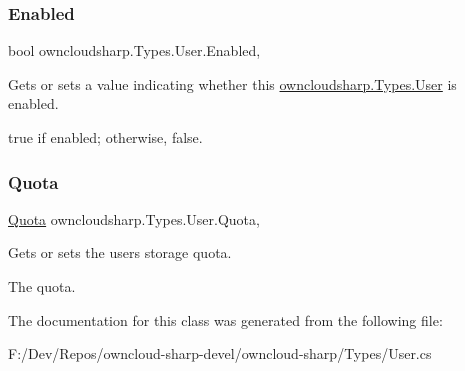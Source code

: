 \subsubsection{\texorpdfstring{Enabled}{Enabled}}
{\footnotesize\ttfamily bool owncloudsharp.\+Types.\+User.\+Enabled\hspace{0.3cm}{\ttfamily [get]}, {\ttfamily [set]}}



Gets or sets a value indicating whether this \hyperlink{classowncloudsharp_1_1_types_1_1_user}{owncloudsharp.\+Types.\+User} is enabled. 

{\ttfamily true} if enabled; otherwise, {\ttfamily false}.\mbox{\label{classowncloudsharp_1_1_types_1_1_user_aff24ca447feae66be8ef929cd94a2d21}} 
\subsubsection{\texorpdfstring{Quota}{Quota}}
{\footnotesize\ttfamily \hyperlink{classowncloudsharp_1_1_types_1_1_quota}{Quota} owncloudsharp.\+Types.\+User.\+Quota\hspace{0.3cm}{\ttfamily [get]}, {\ttfamily [set]}}



Gets or sets the users storage quota. 

The quota.

The documentation for this class was generated from the following file\+:\begin{DoxyCompactItemize}
\item 
F\+:/\+Dev/\+Repos/owncloud-\/sharp-\/devel/owncloud-\/sharp/\+Types/User.\+cs\end{DoxyCompactItemize}
